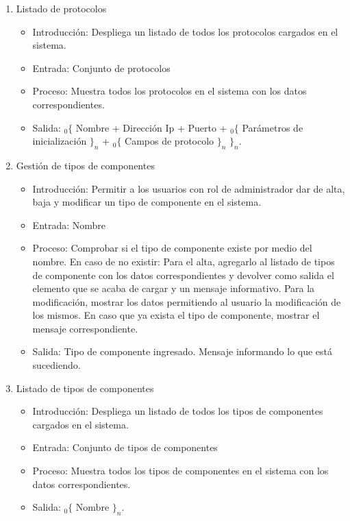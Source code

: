 \begin{enumerate}
			\item Listado de protocolos
				\begin{itemize}
					\item Introducción: Despliega un listado de todos los protocolos cargados en el sistema.
					\item Entrada: Conjunto de protocolos
					\item Proceso: Muestra todos los protocolos en el sistema con los datos correspondientes.
					\item Salida: ${}_{0}\{$ Nombre + Dirección Ip + Puerto + ${}_{0}\{$ Parámetros de inicialización $\}_n$ + ${}_{0}\{$ Campos de protocolo $\}_n$ $\}_n$.
				\end{itemize}
			
			\item Gestión de tipos de componentes
				\begin{itemize}
					\item Introducción: Permitir a los usuarios con rol de administrador dar de alta, baja y modificar un tipo de componente en el sistema.
					\item Entrada: Nombre
					\item Proceso: Comprobar si el tipo de componente existe por medio del nombre. En caso de no existir: 
					Para el alta, agregarlo al listado de tipos de componente con los datos correspondientes y devolver como salida el elemento que se acaba de cargar y un mensaje informativo.
					Para la modificación, mostrar los datos permitiendo al usuario la modificación de los mismos.
					En caso que ya exista el tipo de componente, mostrar el mensaje correspondiente.
					\item Salida: Tipo de componente ingresado. Mensaje informando lo que está sucediendo.
				\end{itemize}
			
			\item Listado de tipos de componentes
				\begin{itemize}
					\item Introducción: Despliega un listado de todos los tipos de componentes cargados en el sistema.
					\item Entrada: Conjunto de tipos de componentes
					\item Proceso: Muestra todos los tipos de componentes en el sistema con los datos correspondientes.
					\item Salida: ${}_{0}\{$ Nombre $\}_n$.
				\end{itemize}
				

\end{enumerate}
